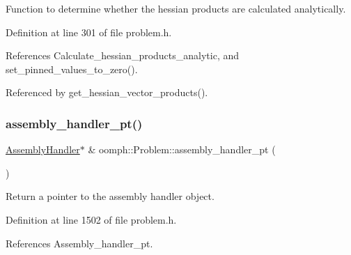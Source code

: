 Function to determine whether the hessian products are calculated analytically. 



Definition at line 301 of file problem.\+h.



References Calculate\+\_\+hessian\+\_\+products\+\_\+analytic, and set\+\_\+pinned\+\_\+values\+\_\+to\+\_\+zero().



Referenced by get\+\_\+hessian\+\_\+vector\+\_\+products().

\mbox{\label{classoomph_1_1Problem_a2edfe33241276bdba87927aacead3099}} 
\subsubsection{\texorpdfstring{assembly\+\_\+handler\+\_\+pt()}{assembly\_handler\_pt()}\hspace{0.1cm}{\footnotesize\ttfamily [1/2]}}
{\footnotesize\ttfamily \hyperlink{classoomph_1_1AssemblyHandler}{Assembly\+Handler}$\ast$ \& oomph\+::\+Problem\+::assembly\+\_\+handler\+\_\+pt (\begin{DoxyParamCaption}{ }\end{DoxyParamCaption})\hspace{0.3cm}{\ttfamily [inline]}}



Return a pointer to the assembly handler object. 



Definition at line 1502 of file problem.\+h.



References Assembly\+\_\+handler\+\_\+pt.



